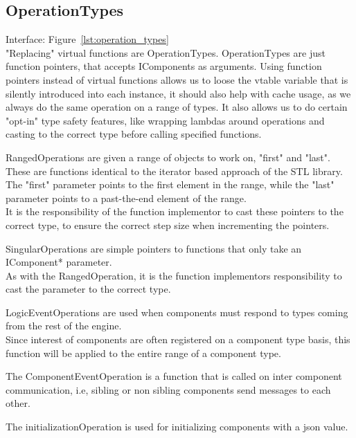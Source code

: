 \subsection{OperationTypes}
Interface: Figure~\ref{lst:operation_types}\\\noindent
"Replacing" virtual functions are OperationTypes.
OperationTypes are just function pointers, that accepts IComponents as arguments.
Using function pointers instead of virtual functions allows us to loose
the vtable variable that is silently introduced into each instance,
it should also help with cache usage, as we always do the same operation on a range of types.
It also allows us to do certain "opt-in" type safety features,
like wrapping lambdas around operations and casting to the correct type before calling specified functions.

RangedOperations are given a range of objects to work on, "first" and "last".
These are functions identical to the iterator based approach of the STL library.\\
The "first" parameter points to the first element in the range, while the "last" parameter points to a past-the-end element of the range.\\
It is the responsibility of the function implementor to cast these pointers to the correct type, 
to ensure the correct step size when incrementing the pointers.

SingularOperations are simple pointers to functions that only take an IComponent* parameter.\\
As with the RangedOperation, it is the function implementors responsibility to cast the parameter to the correct type.

LogicEventOperations are used when components must respond to types coming from the rest of the engine.\\
Since interest of components are often registered on a component type basis,
this function will be applied to the entire range of a component type.

The ComponentEventOperation is a function that is called on inter component communication, i.e, 
sibling or non sibling components send messages to each other.

The initializationOperation is used for initializing components with a json value.
